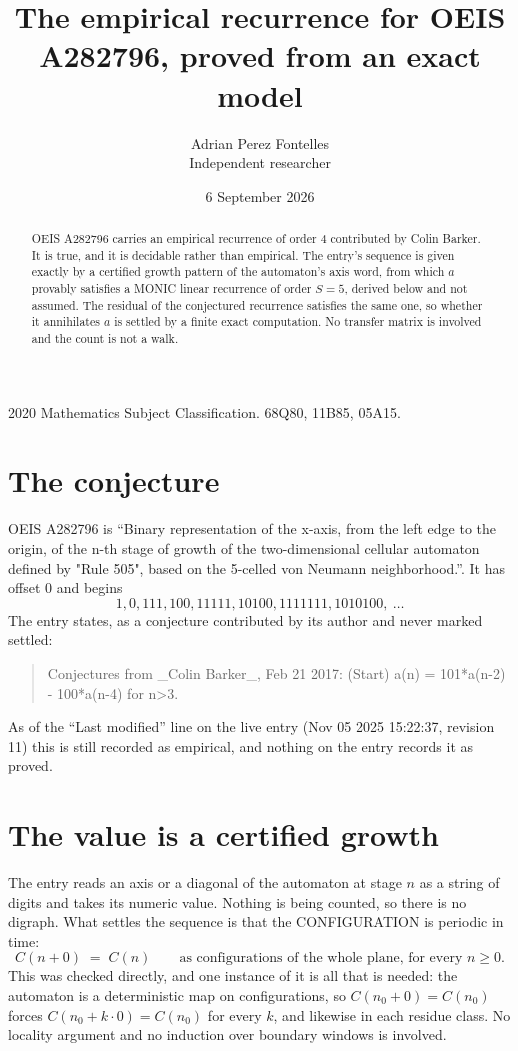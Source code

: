 \documentclass[11pt,a4paper]{article}
\title{The empirical recurrence for OEIS A282796, proved from an exact model}
\author{Adrian Perez Fontelles\\ \small Independent researcher}
\date{6 September 2026}
\theoremstyle{plain}
\theoremstyle{definition}
\begin{document}
\maketitle

\begin{abstract}
OEIS A282796 carries an empirical recurrence of order $4$ contributed by Colin Barker. It is true, and it is
decidable rather than empirical. The entry's sequence is given exactly by a certified growth pattern of the automaton's axis word, from
which $a$ provably satisfies a MONIC linear recurrence of order $S=5$, derived below and not
assumed. The residual of the conjectured recurrence satisfies the same one, so whether it
annihilates $a$ is settled by a finite exact computation. No transfer matrix is involved and
the count is not a walk.
\end{abstract}

\noindent\small 2020 Mathematics Subject Classification. 68Q80, 11B85, 05A15.\normalsize

\section{The conjecture}

OEIS A282796 is ``Binary representation of the x-axis, from the left edge to the origin, of the n-th stage of growth of the two-dimensional cellular automaton defined by "Rule 505", based on the 5-celled von Neumann neighborhood.''. It has offset $0$ and begins
\[
1, 0, 111, 100, 11111, 10100, 1111111, 1010100,\ \dots
\]
The entry states, as a conjecture contributed by its author and never marked settled:
\begin{quote}
Conjectures from \_Colin Barker\_, Feb 21 2017: (Start) a(n) = 101*a(n-2) - 100*a(n-4) for n>3.
\end{quote}
As of the ``Last modified'' line on the live entry (Nov 05 2025 15:22:37, revision 11)
this is still recorded as empirical, and nothing on the entry records it as proved.

\section{The value is a certified growth}

The entry reads an axis or a diagonal of the automaton at stage $n$ as a string of digits and
takes its numeric value. Nothing is being counted, so there is no digraph. What settles the
sequence is that the CONFIGURATION is periodic in time:
\[
C(n+0)\;=\;C(n)\qquad\text{as configurations of the whole plane, for every } n\ge 0.
\]
This was checked directly, and one instance of it is all that is needed: the automaton is a
deterministic map on configurations, so $C(n_0+0)=C(n_0)$ forces $C(n_0+k\cdot0)=C(n_0)$ for
every $k$, and likewise in each residue class. No locality argument and no induction over
boundary windows is involved.
\end{document}
